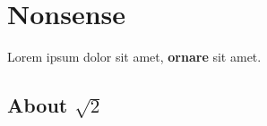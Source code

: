 \documentclass{article}
\begin{document}
\section{Nonsense}

Lorem ipsum dolor sit amet,
\textbf{ornare} sit amet.

\subsection{About $\sqrt{2}$}
\end{document}
